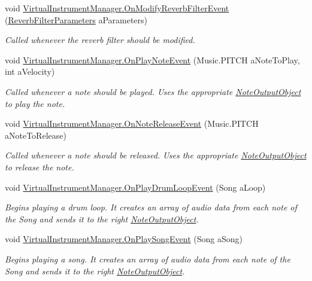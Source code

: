 \begin{DoxyCompactItemize}
void \hyperlink{group___virtual_instrument_manager_event_types_ga2b310217971075b1b2db67d68fbbea5a}{Virtual\+Instrument\+Manager.\+On\+Modify\+Reverb\+Filter\+Event} (\hyperlink{group___virtual_instrument_manager_event_types_struct_virtual_instrument_manager_1_1_reverb_filter_parameters}{Reverb\+Filter\+Parameters} a\+Parameters)
\begin{DoxyCompactList}\small\item\em Called whenever the reverb filter should be modified. \end{DoxyCompactList}\item 
void \hyperlink{group___virtual_instrument_manager_event_types_ga80b3821df3b1488a150f6062638f105c}{Virtual\+Instrument\+Manager.\+On\+Play\+Note\+Event} (Music.\+P\+I\+T\+CH a\+Note\+To\+Play, int a\+Velocity)
\begin{DoxyCompactList}\small\item\em Called whenever a note should be played. Uses the appropriate \hyperlink{class_note_output_object}{Note\+Output\+Object} to play the note. \end{DoxyCompactList}\item 
void \hyperlink{group___virtual_instrument_manager_event_types_gadae914ac99141bc37853d3c536c3943a}{Virtual\+Instrument\+Manager.\+On\+Note\+Release\+Event} (Music.\+P\+I\+T\+CH a\+Note\+To\+Release)
\begin{DoxyCompactList}\small\item\em Called whenever a note should be released. Uses the appropriate \hyperlink{class_note_output_object}{Note\+Output\+Object} to release the note. \end{DoxyCompactList}\item 
void \hyperlink{group___virtual_instrument_manager_event_types_gae2e2010b9a36ae2409466181ae0b9679}{Virtual\+Instrument\+Manager.\+On\+Play\+Drum\+Loop\+Event} (Song a\+Loop)
\begin{DoxyCompactList}\small\item\em Begins playing a drum loop. It creates an array of audio data from each note of the Song and sends it to the right \hyperlink{class_note_output_object}{Note\+Output\+Object}. \end{DoxyCompactList}\item 
void \hyperlink{group___virtual_instrument_manager_event_types_ga7fd877a7d429403abbfd2728aa63c056}{Virtual\+Instrument\+Manager.\+On\+Play\+Song\+Event} (Song a\+Song)
\begin{DoxyCompactList}\small\item\em Begins playing a song. It creates an array of audio data from each note of the Song and sends it to the right \hyperlink{class_note_output_object}{Note\+Output\+Object}. \end{DoxyCompactList}\end{DoxyCompactItemize}
